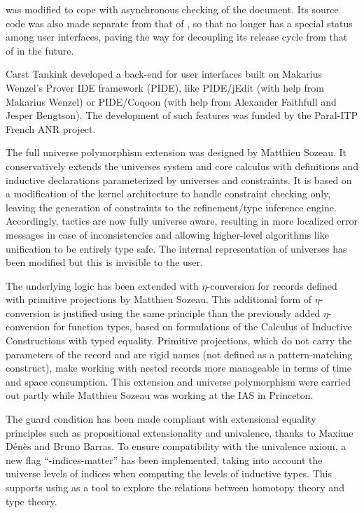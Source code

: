 {\CoqIDE} was modified to cope with asynchronous checking of the
document.  Its source code was also made separate from that of {\Coq}, so
that {\CoqIDE} no longer has a special status among user interfaces,
paving the way for decoupling its release cycle from that of {\Coq} in
the future.

Carst Tankink developed a {\Coq} back-end for user interfaces built on
Makarius Wenzel's Prover IDE framework (PIDE), like PIDE/jEdit (with
help from Makarius Wenzel) or PIDE/Coqoon (with help from Alexander
Faithfull and Jesper Bengtson).  The development of such features was
funded by the Paral-ITP French ANR project.

The full universe polymorphism extension was designed by Matthieu
Sozeau. It conservatively extends the universes system and core calculus
with definitions and inductive declarations parameterized by universes
and constraints. It is based on a modification of the kernel architecture to
handle constraint checking only, leaving the generation of constraints
to the refinement/type inference engine. Accordingly, tactics are now
fully universe aware, resulting in more localized error messages in case
of inconsistencies and allowing higher-level algorithms like unification
to be entirely type safe. The internal representation of universes has
been modified but this is invisible to the user. 

The underlying logic has been extended with $\eta$-conversion for
records defined with primitive projections by Matthieu Sozeau. This
additional form of $\eta$-conversion is justified using the same
principle than the previously added $\eta$-conversion for function
types, based on formulations of the Calculus of Inductive Constructions
with typed equality. Primitive projections, which do not carry the
parameters of the record and are rigid names (not defined as a
pattern-matching construct), make working with nested records more
manageable in terms of time and space consumption. This extension and
universe polymorphism were carried out partly while Matthieu Sozeau was working
at the IAS in Princeton.

The guard condition has been made compliant with extensional equality
principles such as propositional extensionality and univalence, thanks to
Maxime Dénès and Bruno Barras. To ensure compatibility with the
univalence axiom, a new flag ``-indices-matter'' has been implemented, 
taking into account the universe levels of indices when computing the
levels of inductive types. This supports using {\Coq} as a tool to explore
the relations between homotopy theory and type theory.

